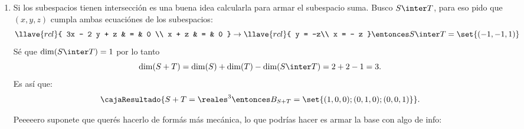 \begin{enumerate}[label=(\alph*)]
  \item Si los subespacios tienen intersección es una buena idea calcularla para armar el subespacio suma. Busco $S \inter T$,
        para eso pido que $(x, y, z)$ cumpla ambas ecuaciónes de los subespacios:
        $$
          \llave{rcl}{
            3x - 2 y  + z & = &  0 \\
            x + z & = &  0
          }
          \to
          \llave{rcl}{
            y = -z\\
            x = - z
          }
          \entonces
          S \inter T = \set{(-1, -1, 1)}
        $$
        Sé que $\dim(S \inter T) = 1$ por lo tanto
        $$
          \dim(S + T) = \dim(S) + \dim(T) - \dim(S \inter T) = 2 + 2 - 1 = 3.
        $$
        Es así que:
        $$\cajaResultado{
            S + T = \reales^3 \entonces B_{S+T} = \set{(1,0,0); (0,1,0); (0,0,1)}
          }.
        $$

        Peeeeero suponete que querés hacerlo de formás más mecánica, lo que podrías hacer es armar la base con algo de info:


\end{enumerate}
